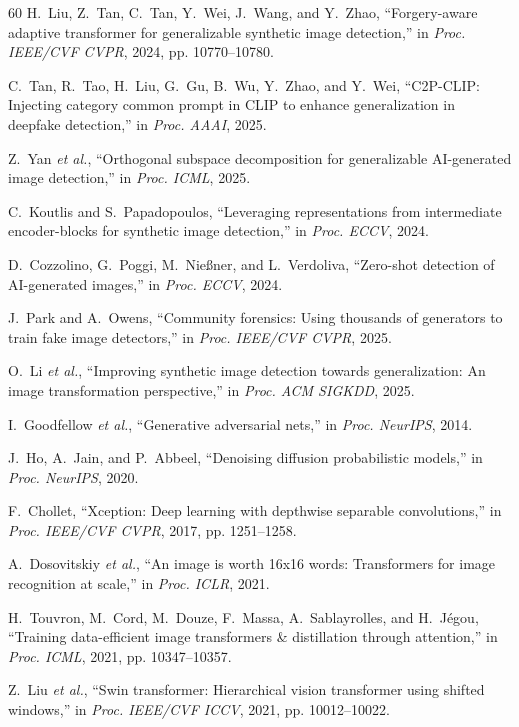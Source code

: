 \documentclass[journal]{IEEEtran}
\begin{document}
\begin{thebibliography}{60}
 H.~Liu, Z.~Tan, C.~Tan, Y.~Wei, J.~Wang, and Y.~Zhao, ``Forgery-aware adaptive transformer for generalizable synthetic image detection,'' in \textit{Proc. IEEE/CVF CVPR}, 2024, pp. 10770--10780.

 C.~Tan, R.~Tao, H.~Liu, G.~Gu, B.~Wu, Y.~Zhao, and Y.~Wei, ``C2P-CLIP: Injecting category common prompt in CLIP to enhance generalization in deepfake detection,'' in \textit{Proc. AAAI}, 2025.

 Z.~Yan \textit{et al.}, ``Orthogonal subspace decomposition for generalizable AI-generated image detection,'' in \textit{Proc. ICML}, 2025.

 C.~Koutlis and S.~Papadopoulos, ``Leveraging representations from intermediate encoder-blocks for synthetic image detection,'' in \textit{Proc. ECCV}, 2024.

 D.~Cozzolino, G.~Poggi, M.~Nie{\ss}ner, and L.~Verdoliva, ``Zero-shot detection of AI-generated images,'' in \textit{Proc. ECCV}, 2024.

 J.~Park and A.~Owens, ``Community forensics: Using thousands of generators to train fake image detectors,'' in \textit{Proc. IEEE/CVF CVPR}, 2025.

 O.~Li \textit{et al.}, ``Improving synthetic image detection towards generalization: An image transformation perspective,'' in \textit{Proc. ACM SIGKDD}, 2025.

 I.~Goodfellow \textit{et al.}, ``Generative adversarial nets,'' in \textit{Proc. NeurIPS}, 2014.

 J.~Ho, A.~Jain, and P.~Abbeel, ``Denoising diffusion probabilistic models,'' in \textit{Proc. NeurIPS}, 2020.

 F.~Chollet, ``Xception: Deep learning with depthwise separable convolutions,'' in \textit{Proc. IEEE/CVF CVPR}, 2017, pp. 1251--1258.

 A.~Dosovitskiy \textit{et al.}, ``An image is worth 16x16 words: Transformers for image recognition at scale,'' in \textit{Proc. ICLR}, 2021.

 H.~Touvron, M.~Cord, M.~Douze, F.~Massa, A.~Sablayrolles, and H.~J\'egou, ``Training data-efficient image transformers \& distillation through attention,'' in \textit{Proc. ICML}, 2021, pp. 10347--10357.

 Z.~Liu \textit{et al.}, ``Swin transformer: Hierarchical vision transformer using shifted windows,'' in \textit{Proc. IEEE/CVF ICCV}, 2021, pp. 10012--10022.


\end{thebibliography}
\end{document}
